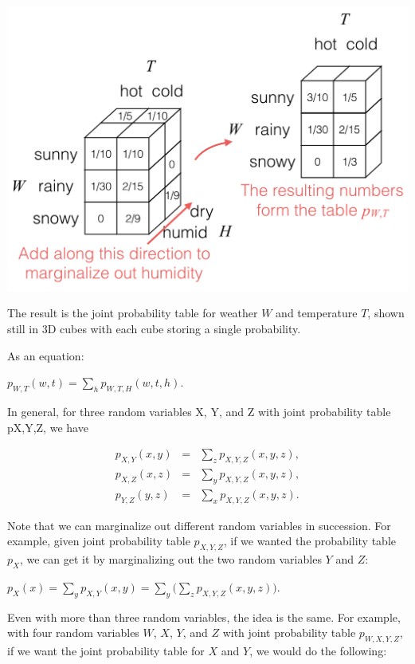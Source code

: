 \documentclass[6008notes.tex]{subfiles}
\begin{document}
{\centering\includegraphics[scale=0.45]{images_sec-joint-rv-marg-many-rv-marg} \par}

The result is the joint probability table for weather $W$ and temperature $T$, shown still in 3D cubes with each cube storing a single probability.

As an equation:

{\centering$p_{W,T}(w,t) = \sum _ h p_{W,T,H}(w, t, h).$ \par}
 
In general, for three random variables X, Y, and Z with joint probability table pX,Y,Z, we have

\begin{eqnarray*}
p_{X,Y}(x,y)
&=&
\sum_{z} p_{X,Y,Z}(x,y,z), \\
p_{X,Z}(x,z)
&=&
\sum_{y} p_{X,Y,Z}(x,y,z), \\
p_{Y,Z}(y,z)
&=&
\sum_{x} p_{X,Y,Z}(x,y,z).
\end{eqnarray*}

Note that we can marginalize out different random variables in succession. For example, given joint probability table $p_{X,Y,Z}$, if we wanted the probability table $p_X$, we can get it by marginalizing out the two random variables $Y$ and $Z$:

{\centering$p_ X(x) = \sum _{y} p_{X,Y}(x,y) = \sum _{y} \Big( \sum _{z} p_{X,Y,Z}(x,y,z) \Big).$ \par}
 
Even with more than three random variables, the idea is the same. For example, with four random variables $W$, $X$, $Y$, and $Z$ with joint probability table $p_{W,X,Y,Z}$, if we want the joint probability table for $X$ and $Y$, we would do the following:
\end{document}
